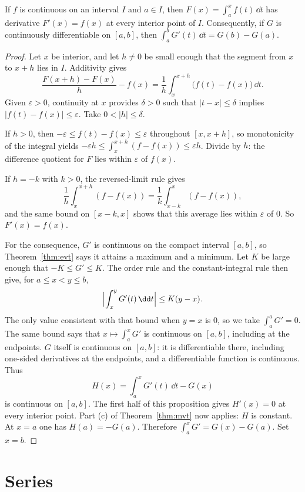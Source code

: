 \begin{proposition}\label{prop:early-ftc}
If $f$ is continuous on an interval $I$ and $a\in I$, then $F(x)=\int_a^x f(t)\,\dd t$ has derivative $F'(x)=f(x)$ at every interior point of $I$. Consequently, if $G$ is continuously differentiable on $[a,b]$, then $\int_a^b G'(t)\,\dd t=G(b)-G(a)$.
\end{proposition}
\begin{proof}
Let $x$ be interior, and let $h\ne0$ be small enough that the segment from $x$ to $x+h$ lies in $I$. Additivity gives
\[
\frac{F(x+h)-F(x)}h-f(x)=\frac1h\int_x^{x+h}\bigl(f(t)-f(x)\bigr)\,\dd t.
\]
Given $\varepsilon>0$, continuity at $x$ provides $\delta>0$ such that $|t-x|\le\delta$ implies $|f(t)-f(x)|\le\varepsilon$. Take $0<|h|\le\delta$.

If $h>0$, then $-\varepsilon\le f(t)-f(x)\le\varepsilon$ throughout $[x,x+h]$, so monotonicity of the integral yields $-\varepsilon h\le\int_x^{x+h}(f-f(x))\le\varepsilon h$. Divide by $h$: the difference quotient for $F$ lies within $\varepsilon$ of $f(x)$.

If $h=-k$ with $k>0$, the reversed-limit rule gives
\[
\frac1h\int_x^{x+h}(f-f(x))=\frac1k\int_{x-k}^x(f-f(x)),
\]
and the same bound on $[x-k,x]$ shows that this average lies within $\varepsilon$ of $0$. So $F'(x)=f(x)$.

For the consequence, $G'$ is continuous on the compact interval $[a,b]$, so Theorem~\ref{thm:evt} says it attains a maximum and a minimum. Let $K$ be large enough that $-K\le G'\le K$. The order rule and the constant-integral rule then give, for $a\le x<y\le b$,
\[
\Bigl|\int_x^y G'(t)\,\dd t\Bigr|\le K(y-x).
\]
The only value consistent with that bound when $y=x$ is $0$, so we take $\int_a^a G'=0$. The same bound says that $x\mapsto\int_a^x G'$ is continuous on $[a,b]$, including at the endpoints. $G$ itself is continuous on $[a,b]$: it is differentiable there, including one-sided derivatives at the endpoints, and a differentiable function is continuous. Thus
\[
H(x)=\int_a^x G'(t)\,\dd t-G(x)
\]
is continuous on $[a,b]$. The first half of this proposition gives $H'(x)=0$ at every interior point. Part (c) of Theorem~\ref{thm:mvt} now applies: $H$ is constant. At $x=a$ one has $H(a)=-G(a)$. Therefore $\int_a^x G'=G(x)-G(a)$. Set $x=b$.
\end{proof}

\section{Series}

